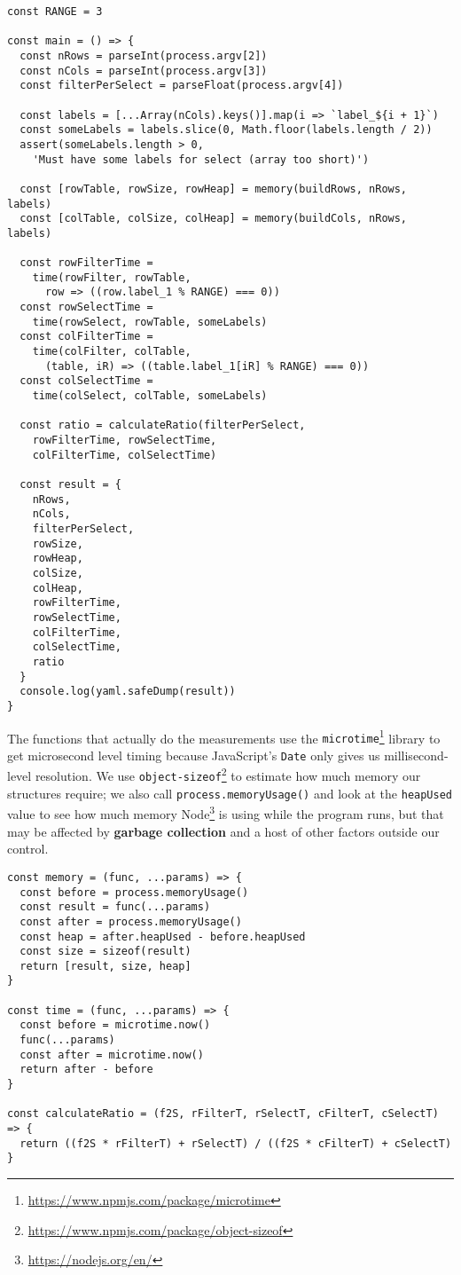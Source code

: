 \documentclass[krantzl]{krantz}
\newcommand{\glossref}[1]{\textbf{#1}}
\newcommand{\hreffoot}[2]{{#1}\footnote{\href{#2}{#2}}}
\begin{document}
\begin{lstlisting}[frame=tblr]
const RANGE = 3

const main = () => {
  const nRows = parseInt(process.argv[2])
  const nCols = parseInt(process.argv[3])
  const filterPerSelect = parseFloat(process.argv[4])

  const labels = [...Array(nCols).keys()].map(i => `label_${i + 1}`)
  const someLabels = labels.slice(0, Math.floor(labels.length / 2))
  assert(someLabels.length > 0,
    'Must have some labels for select (array too short)')

  const [rowTable, rowSize, rowHeap] = memory(buildRows, nRows, labels)
  const [colTable, colSize, colHeap] = memory(buildCols, nRows, labels)

  const rowFilterTime =
    time(rowFilter, rowTable,
      row => ((row.label_1 % RANGE) === 0))
  const rowSelectTime =
    time(rowSelect, rowTable, someLabels)
  const colFilterTime =
    time(colFilter, colTable,
      (table, iR) => ((table.label_1[iR] % RANGE) === 0))
  const colSelectTime =
    time(colSelect, colTable, someLabels)

  const ratio = calculateRatio(filterPerSelect,
    rowFilterTime, rowSelectTime,
    colFilterTime, colSelectTime)

  const result = {
    nRows,
    nCols,
    filterPerSelect,
    rowSize,
    rowHeap,
    colSize,
    colHeap,
    rowFilterTime,
    rowSelectTime,
    colFilterTime,
    colSelectTime,
    ratio
  }
  console.log(yaml.safeDump(result))
}
\end{lstlisting}



The functions that actually do the measurements
use the \hreffoot{\texttt{microtime}}{https://www.npmjs.com/package/microtime} library to get microsecond level timing
because JavaScript’s \texttt{Date} only gives us millisecond-level resolution.
We use \hreffoot{\texttt{object-sizeof}}{https://www.npmjs.com/package/object-sizeof} to estimate how much memory our structures require;
we also call \texttt{process.memoryUsage()} and look at the \texttt{heapUsed} value
to see how much memory \hreffoot{Node}{https://nodejs.org/en/} is using while the program runs,
but that may be affected by \glossref{garbage collection}
and a host of other factors outside our control.


\begin{lstlisting}[frame=tblr]
const memory = (func, ...params) => {
  const before = process.memoryUsage()
  const result = func(...params)
  const after = process.memoryUsage()
  const heap = after.heapUsed - before.heapUsed
  const size = sizeof(result)
  return [result, size, heap]
}

const time = (func, ...params) => {
  const before = microtime.now()
  func(...params)
  const after = microtime.now()
  return after - before
}

const calculateRatio = (f2S, rFilterT, rSelectT, cFilterT, cSelectT) => {
  return ((f2S * rFilterT) + rSelectT) / ((f2S * cFilterT) + cSelectT)
}
\end{lstlisting}
\end{document}
